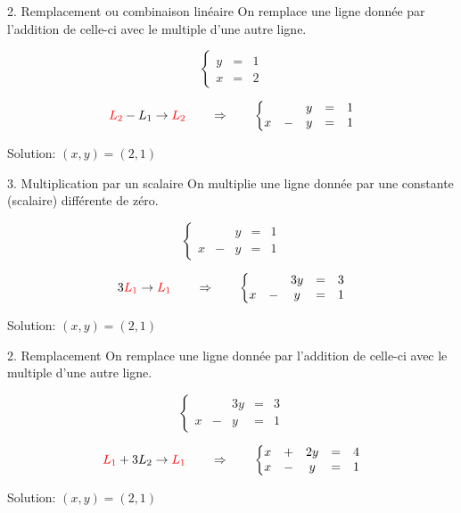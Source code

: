 \documentclass[french]{beamer}
\begin{document}
	
	\begin{frame}{2. Remplacement ou combinaison linéaire}
	On remplace une ligne donnée par l'addition de celle-ci avec le multiple
	d'une autre ligne.
	\begin{example}
		\[
		\left\{
		\begin{matrix}
		    y&=& 1\\
		    x &=& 2
		\end{matrix}
		\right.
		\]		
		

		\[
		{{\color{red}L_2} - L_1 \rightarrow \color{red}L_2}  \qquad \Rightarrow \qquad
		\left\{
		\begin{matrix}
		    &&y&=& 1	\\	
		    x&-&y &=& 1
		\end{matrix}
		\right.
		\]		
			
		{\tiny\color{blue}Solution: $(x, y) = (2, 1)$}
	\end{example}		
	\end{frame}	
	
	
	\begin{frame}{3. Multiplication par un scalaire}
	On multiplie une ligne donnée par une constante (scalaire) différente de zéro.
	\begin{example}
		\[
		\left\{
		\begin{matrix}
		    &&y&=& 1	\\	
		    x&-&y &=& 1
		\end{matrix}
		\right.
		\]		
		
		\[
		{3{\color{red}L_1}\rightarrow \color{red}L_1}  \qquad \Rightarrow \qquad
		\left\{
		\begin{matrix}
		    &&3y&=& 3	\\	
		    x&-&y &=& 1
		\end{matrix}
		\right.
		\]		
			
		{\tiny\color{blue}Solution: $(x, y) = (2, 1)$}
	\end{example}		
	\end{frame}		
	
	\begin{frame}{2. Remplacement}
	On remplace une ligne donnée par l'addition de celle-ci avec le multiple
	d'une autre ligne.	\begin{example}
		\[
		\left\{
		\begin{matrix}
		    &&3y&=& 3	\\	
		    x&-&y &=& 1
		\end{matrix}
		\right.
		\]		
		
		\[
		{{\color{red}L_1} + 3 L_2 \rightarrow \color{red}L_1}  \qquad \Rightarrow \qquad
		\left\{
		\begin{matrix}
		    x&+&2y&=& 4 \\
		    x&-&y &=& 1
		\end{matrix}
		\right.
		\]		
			
		{\tiny\color{blue}Solution: $(x, y) = (2, 1)$}
	\end{example}		
	\end{frame}		
\end{document}
